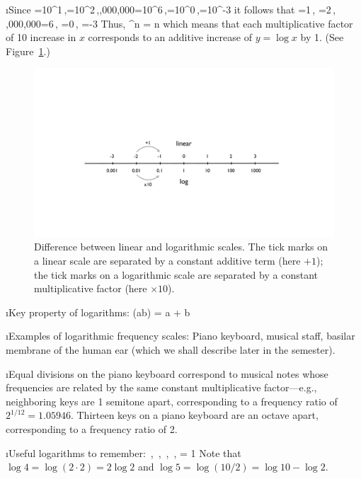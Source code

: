 \i Since 
%
=10^1\,,=10^2\,,,000,000=10^6\,,=10^0\,,=10^{-3}
\ee
%
it follows that
%
\be
{}=1\,,\quad
{}=2\,,\quad
{},000,000=6\,,\quad
{}=0\,,\quad
{}=-3
\ee
%
Thus,
%
\be
{}^n = n
\ee
%
which means that each multiplicative factor of 10 increase 
in $x$ corresponds to an additive increase of $y=\log x$ by 1. 
(See Figure~\ref{f:linear-log}.)
%
\begin{figure}[htbp]
\begin{center}
\includegraphics[width=.8\textwidth]{linear-log}
\caption{Difference between linear and logarithmic scales.
The tick marks on a linear scale are separated by a
constant additive term (here $+1$);
the tick marks on a logarithmic scale are separated by a
constant multiplicative factor (here $\times 10$).}
\label{f:linear-log}
\end{center}
\end{figure}
%

\i Key property of logarithms:
%
\be
\log(ab) = \log a + \log b
\ee
%

\i Examples of logarithmic frequency scales:
Piano keyboard, musical staff, basilar membrane of the
human ear (which we shall describe later in the semester).

\i Equal divisions on the piano keyboard 
correspond to musical notes whose frequencies are related
by the same constant multiplicative factor---e.g., 
neighboring keys are 1 semitone apart, corresponding
to a frequency ratio of 
$2^{1/12}=1.05946$.
Thirteen keys on a piano keyboard are an octave apart, 
corresponding to a frequency ratio of 2.

\i Useful logarithms to remember:
%
\be
{} \,,\quad
{} \,,\quad
{} \,,\quad
{} \,,\quad
{} = 1
\ee
%
Note that $\log 4 = \log(2\cdot 2) = 2\log 2$ and
$\log 5 = \log(10/2) = \log 10-\log 2$.

\ei

